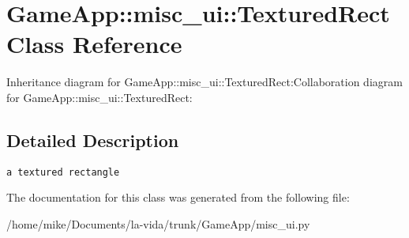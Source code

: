\hypertarget{classGameApp_1_1misc__ui_1_1TexturedRect}{
\section{GameApp::misc\_\-ui::TexturedRect Class Reference}
\label{classGameApp_1_1misc__ui_1_1TexturedRect}
}
Inheritance diagram for GameApp::misc\_\-ui::TexturedRect:Collaboration diagram for GameApp::misc\_\-ui::TexturedRect:

\subsection{Detailed Description}


\footnotesize\begin{verbatim}a textured rectangle\end{verbatim}
\normalsize
 

The documentation for this class was generated from the following file:\begin{CompactItemize}
\item 
/home/mike/Documents/la-vida/trunk/GameApp/misc\_\-ui.py\end{CompactItemize}

